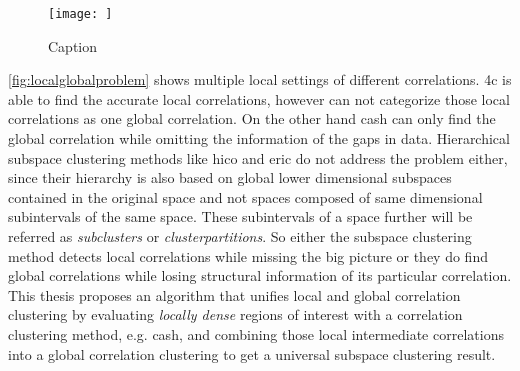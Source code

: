 \begin{figure}
    \centering
    \texttt{[image: ]}
    \caption{Caption}
    \label{fig:localglobalproblem}
\end{figure}

\autoref{fig:localglobalproblem}  shows multiple local settings of different correlations. \gls{4c} is able to find the accurate local correlations, however can not categorize those local correlations as one global correlation. 
On the other hand \gls{cash} can only find the global correlation while omitting the information of the gaps in data. Hierarchical subspace clustering methods like \gls{hico} and \gls{eric} do not address the problem either, since their hierarchy is also based on global lower dimensional subspaces contained in the original space and not spaces composed of same dimensional subintervals of the same space. These subintervals of a space further will be referred as \textit{subclusters} or \textit{clusterpartitions}.
So either the subspace clustering method detects local correlations while missing the big picture or they do find global correlations while losing structural information of its particular correlation. This thesis proposes an algorithm that unifies local and global correlation clustering by evaluating \textit{locally dense} regions of interest with a correlation clustering method, e.g. \gls{cash}, and combining those local intermediate correlations into a global correlation clustering to get a universal subspace clustering result. 


